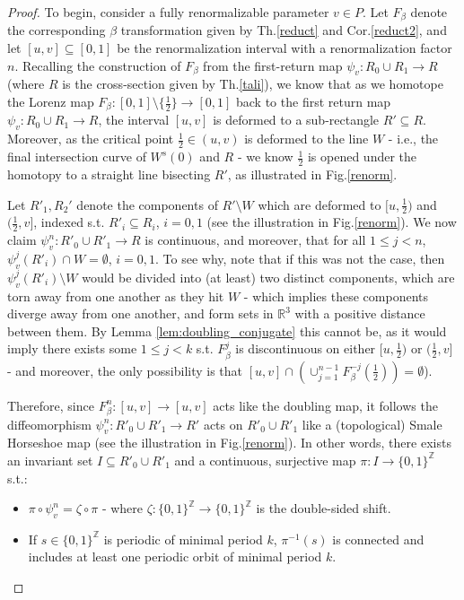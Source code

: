\documentclass[10pt,reqno]{amsart}
\theoremstyle{plain}
\theoremstyle{assumption}
\theoremstyle{notation}
\theoremstyle{claim}
\theoremstyle{conj}
\theoremstyle{theorem}
\theoremstyle{proposition}
\theoremstyle{corollary}
\begin{document}
\begin{proof}
To begin, consider a fully renormalizable parameter $v\in P$. Let $F_\beta$ denote the corresponding $\beta$ transformation given by Th.\ref{reduct} and Cor.\ref{reduct2}, and let $[u,v]\subseteq[0,1]$ be the renormalization interval with a renormalization factor $n$. Recalling the construction of $F_\beta$ from the first-return map $\psi_v:R_0\cup R_1\to R$ (where $R$ is the cross-section given by Th.\ref{tali}), we know that as we homotope the Lorenz map $F_\beta:[0,1]\setminus\{\frac{1}{2}\}\to[0,1]$ back to the first return map $\psi_v:R_0\cup R_1\to R$, the interval $[u,v]$ is deformed to a sub-rectangle $R'\subseteq R$. Moreover, as the critical point $\frac{1}{2}\in(u,v)$ is deformed to the line $W$ - i.e., the final intersection curve of $W^s(0)$ and $R$ - we know $\frac{1}{2}$ is opened under the homotopy to a straight line bisecting $R'$, as illustrated in Fig.\ref{renorm}.

Let $R'_1,R_2'$ denote the components of $R'\setminus W$ which are deformed to $[u,\frac{1}{2})$ and $(\frac{1}{2},v]$, indexed s.t. $R'_i\subseteq R_i$, $i=0,1$ (see the illustration in Fig.\ref{renorm}). We now claim $\psi^n_v:R'_0\cup R'_1\to R$ is continuous, and moreover, that for all $1\leq j<n$, $\psi^j_v(R'_i)\cap W=\emptyset$, $i=0,1$. To see why, note that if this was not the case, then $\psi^j_v(R'_i)\setminus W$ would be divided into (at least) two distinct components, which are torn away from one another as they hit $W$ - which implies these components diverge away from one another, and form sets in $\mathbb{R}^3$ with a positive distance between them. By Lemma \ref{lem:doubling_conjugate} this cannot be, as it would imply there exists some $1\leq j<k$ s.t. $F^j_\beta$ is discontinuous on either $[u,\frac{1}{2})$ or $(\frac{1}{2},v]$ - and moreover, the only possibility is that $[u,v]\cap( \cup_{j=1}^{n-1}F^{-j}_\beta(\frac{1}{2}))=\emptyset$).

Therefore, since $F^n_\beta:[u,v]\to[u,v]$ acts like the doubling map, it follows the diffeomorphism $\psi^n_v:R'_0\cup R'_1\to R'$ acts on $R'_0\cup R'_1$ like a (topological) Smale Horseshoe map (see the illustration in Fig.\ref{renorm}). In other words, there exists an invariant set $I\subseteq R'_0\cup R'_1$ and a continuous, surjective map $\pi:I\to\{0,1\}^\mathbb{Z}$ s.t.:

\begin{itemize}
    \item $\pi\circ\psi^n_v=\zeta\circ\pi$ - where $\zeta:\{0,1\}^\mathbb{Z}\to\{0,1\}^\mathbb{Z}$ is the double-sided shift. 
    \item If $s\in\{0,1\}^\mathbb{Z}$ is periodic of minimal period $k$, $\pi^{-1}(s)$ is connected and includes at least one periodic orbit of minimal period $k$.
\end{itemize}



\end{proof}
\end{document}
